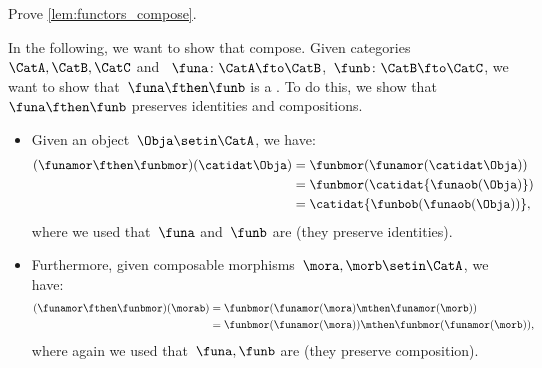 \begin{exercise}
    Prove \cref{lem:functors_compose}.
\end{exercise}
\begin{solution}
    In the following, we want to show that  compose.
    Given categories~$\CatA,\CatB,\CatC$ and ~$\funa\colon \CatA\fto \CatB$,~$\funb \colon \CatB\fto \CatC$, we want to show that~$\funa\fthen\funb$ is a .
    To do this, we show that~$\funa\fthen\funb$ preserves identities and compositions.
    \begin{itemize}
        \item Given an object~$\Obja\setin \CatA$, we have:
              \begin{equation}
                  \begin{aligned}
                      (\funamor\fthen\funbmor)(\catidat\Obja)
                       & =\funbmor(\funamor(\catidat\Obja)) \\
                       & =\funbmor(\catidat{\funaob(\Obja)}) \\
                       & =\catidat{\funbob(\funaob(\Obja))},
                  \end{aligned}
              \end{equation}
              where we used that~$\funa$ and~$\funb$ are  (they preserve identities).
        \item Furthermore, given composable morphisms~$\mora,\morb\setin \CatA$, we have:
              \begin{equation}
                  \begin{aligned}
                      (\funamor\fthen\funbmor)(\morab)
                       & =\funbmor(\funamor(\mora)\mthen \funamor(\morb)) \\
                       & =\funbmor(\funamor(\mora))\mthen \funbmor(\funamor(\morb)),
                  \end{aligned}
              \end{equation}
              where again we used that~$\funa,\funb$ are  (they preserve composition).
    \end{itemize}
\end{solution}


